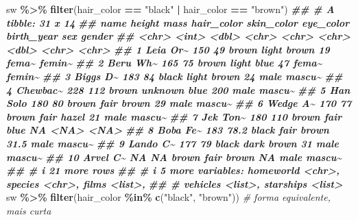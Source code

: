\documentclass[
  portuguese,
  11pt,
  openany]{book}
\newenvironment{Shaded}{\begin{snugshade}}{\end{snugshade}}
\newcommand{\CommentTok}[1]{\textcolor[rgb]{0.56,0.35,0.01}{\textit{#1}}}
\newcommand{\DocumentationTok}[1]{\textcolor[rgb]{0.56,0.35,0.01}{\textbf{\textit{#1}}}}
\newcommand{\FunctionTok}[1]{\textcolor[rgb]{0.13,0.29,0.53}{\textbf{#1}}}
\newcommand{\NormalTok}[1]{#1}
\newcommand{\SpecialCharTok}[1]{\textcolor[rgb]{0.81,0.36,0.00}{\textbf{#1}}}
\newcommand{\StringTok}[1]{\textcolor[rgb]{0.31,0.60,0.02}{#1}}
\begin{document}
\begin{Shaded}
\begin{Highlighting}[]
\NormalTok{sw }\SpecialCharTok{\%\textgreater{}\%} \FunctionTok{filter}\NormalTok{(hair\_color }\SpecialCharTok{==} \StringTok{"black"} \SpecialCharTok{|}\NormalTok{ hair\_color }\SpecialCharTok{==} \StringTok{"brown"}\NormalTok{)}
\DocumentationTok{\#\# \# A tibble: 31 x 14}
\DocumentationTok{\#\#    name     height  mass hair\_color skin\_color eye\_color birth\_year sex   gender}
\DocumentationTok{\#\#    \textless{}chr\textgreater{}     \textless{}int\textgreater{} \textless{}dbl\textgreater{} \textless{}chr\textgreater{}      \textless{}chr\textgreater{}      \textless{}chr\textgreater{}          \textless{}dbl\textgreater{} \textless{}chr\textgreater{} \textless{}chr\textgreater{} }
\DocumentationTok{\#\#  1 Leia Or\textasciitilde{}    150  49   brown      light      brown           19   fema\textasciitilde{} femin\textasciitilde{}}
\DocumentationTok{\#\#  2 Beru Wh\textasciitilde{}    165  75   brown      light      blue            47   fema\textasciitilde{} femin\textasciitilde{}}
\DocumentationTok{\#\#  3 Biggs D\textasciitilde{}    183  84   black      light      brown           24   male  mascu\textasciitilde{}}
\DocumentationTok{\#\#  4 Chewbac\textasciitilde{}    228 112   brown      unknown    blue           200   male  mascu\textasciitilde{}}
\DocumentationTok{\#\#  5 Han Solo    180  80   brown      fair       brown           29   male  mascu\textasciitilde{}}
\DocumentationTok{\#\#  6 Wedge A\textasciitilde{}    170  77   brown      fair       hazel           21   male  mascu\textasciitilde{}}
\DocumentationTok{\#\#  7 Jek Ton\textasciitilde{}    180 110   brown      fair       blue            NA   \textless{}NA\textgreater{}  \textless{}NA\textgreater{}  }
\DocumentationTok{\#\#  8 Boba Fe\textasciitilde{}    183  78.2 black      fair       brown           31.5 male  mascu\textasciitilde{}}
\DocumentationTok{\#\#  9 Lando C\textasciitilde{}    177  79   black      dark       brown           31   male  mascu\textasciitilde{}}
\DocumentationTok{\#\# 10 Arvel C\textasciitilde{}     NA  NA   brown      fair       brown           NA   male  mascu\textasciitilde{}}
\DocumentationTok{\#\# \# i 21 more rows}
\DocumentationTok{\#\# \# i 5 more variables: homeworld \textless{}chr\textgreater{}, species \textless{}chr\textgreater{}, films \textless{}list\textgreater{},}
\DocumentationTok{\#\# \#   vehicles \textless{}list\textgreater{}, starships \textless{}list\textgreater{}}
\NormalTok{sw }\SpecialCharTok{\%\textgreater{}\%} \FunctionTok{filter}\NormalTok{(hair\_color }\SpecialCharTok{\%in\%} \FunctionTok{c}\NormalTok{(}\StringTok{"black"}\NormalTok{, }\StringTok{"brown"}\NormalTok{))   }\CommentTok{\# forma equivalente, mais curta}

\end{Highlighting}
\end{Shaded}
\end{document}
